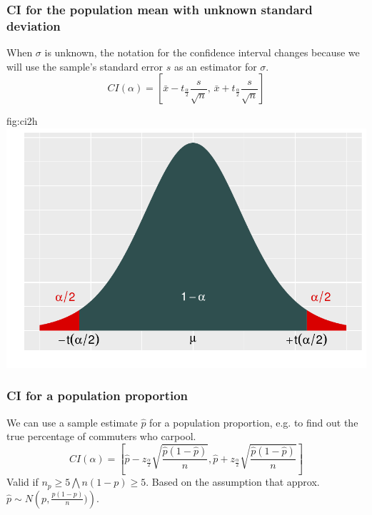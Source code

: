 	\subsubsection{CI for the population mean with unknown standard deviation}	
		When $\sigma$ is unknown, the notation for the confidence interval changes because we will use the sample's standard error $s$ as an estimator for $\sigma$.
		\begin{equation*}
			CI(\alpha)=\left[\bar{x}-t_{\frac{\alpha}{2}}\frac{s}{\sqrt{n}},\,\bar{x}+t_{\frac{\alpha}{2}}\frac{s}{\sqrt{n}}\right]
		\end{equation*}
		\begin{fig}{fig:ci2}{h}
			\includegraphics[width=\textwidth]{P12ci.pdf}
		\end{fig}	
	\subsubsection{CI for a population proportion}	
		We can use a sample estimate $\hat{p}$ for a population proportion, e.g. to find out the true percentage of commuters who carpool.
		\begin{equation*}
			CI(\alpha)=\left[\hat{p}-z_{\frac{\alpha}{2}}\sqrt{\frac{\hat{p}(1-\hat{p})}{n}},\hat{p}+z_{\frac{\alpha}{2}}\sqrt{\frac{\hat{p}(1-\hat{p})}{n}}\right]
		\end{equation*}
		Valid if $n_p\geq 5 \bigwedge n(1-p)\geq 5$. Based on the assumption that approx. $\hat{p}\sim N\left(p,\frac{p(1-p)}{n})\right)$.
